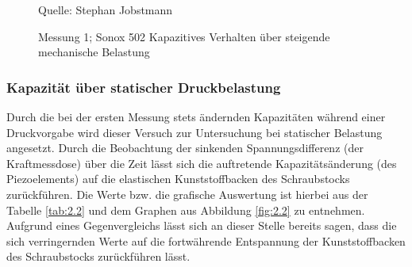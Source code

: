 \documentclass[12pt]{scrreprt} %
\begin{document}
\begin {figure}[htbp]
	\caption[Messung 1; Sonox 502 Kapazitives Verhalten]{Messung 1; Sonox 502 Kapazitives Verhalten über steigende mechanische Belastung}
      \begin{center}
      \end{center}
Quelle: Stephan Jobstmann
\label{fig:2.1}
\end{figure}

\subsubsection{Kapazität über statischer Druckbelastung}
Durch die bei der ersten Messung stets ändernden Kapazitäten während einer Druckvorgabe wird dieser Versuch zur Untersuchung bei statischer Belastung angesetzt. Durch die Beobachtung der sinkenden Spannungsdifferenz (der Kraftmessdose) über die Zeit lässt sich die auftretende Kapazitätsänderung (des Piezoelements) auf die elastischen Kunststoffbacken des Schraubstocks zurückführen. Die Werte bzw. die grafische Auswertung ist hierbei aus der Tabelle \vref{tab:2.2} und dem Graphen aus Abbildung \vref{fig:2.2} zu entnehmen. \\
Aufgrund eines Gegenvergleichs lässt sich an dieser Stelle bereits sagen, dass die sich verringernden Werte auf die fortwährende Entspannung der Kunststoffbacken des Schraubstocks zurückführen lässt.
\end{document}

